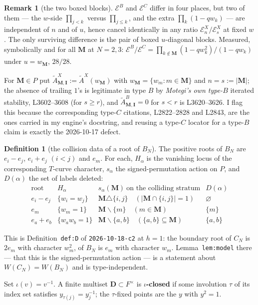 \documentclass[11pt]{article}
\theoremstyle{definition}
\newtheorem{defn}[thm]{Definition}
\newtheorem{rem}[thm]{Remark}
\newcommand{\At}{\widetilde{A}}
\newcommand{\bM}{\mathbf{M}}
\newcommand{\bI}{\mathbf{I}}
\newcommand{\bD}{\mathbf{D}}
\newcommand{\sm}{\smallsetminus}
\newcommand{\EB}{\mathcal{E}^{B}}
\newcommand{\EC}{\mathcal{E}^{C}}
\newcommand{\EX}{\mathcal{E}^{X}}
\begin{document}
\begin{rem}[the two boxed blocks]
\label{rem:boxed}
$\EB$ and $\EC$ differ in four places, but two of them --- the $w$-side
$\prod_{j<k}$ versus $\prod_{j\le k}$, and the extra $\prod_k(1-qw_k)$ --- are
independent of $n$ and of $u$, hence cancel identically in any ratio
$\EX_{n}/\EX_{s}$ at fixed $w$.  The only surviving difference is the pair of
boxed $u$-diagonal blocks.  Measured, symbolically and for all $\bM$ at
$N=2,3$: $\EB/\EC=\prod_{k\notin\bM}(1-qw_k^{2})/(1-qw_k)$ under
$u=w_{\bM}$, $28/28$.
\end{rem}

For $\bM\in P$ put $\At^{X}_{\bM,\bI}:=\At^{X}(w_{\bM})$ with
$w_{\bM}=\{w_m:m\in\bM\}$ and $n=s:=|\bM|$; the absence of trailing $1$'s is
legitimate in type $B$ by \emph{Motegi's own type-$B$} iterated stability,
L3602--3608 (for $s\ge r$), and $\At^{B}_{\bM,\bI}=0$ for $s<r$ is L3620--3626.
I flag this because the corresponding type-$C$ citations, L2822--2828 and L2843,
are the ones carried in my engine's docstring, and reusing a type-$C$ locator
for a type-$B$ claim is exactly the 2026-10-17 defect.

\begin{defn}[the collision data of a root of $B_N$]\label{def:D}
The positive roots of $B_N$ are $e_i-e_j$, $e_i+e_j$ $(i<j)$ and $e_m$.  For
each, $H_\alpha$ is the vanishing locus of the corresponding $T$-curve
character, $s_\alpha$ the signed-permutation action on $P$, and $D(\alpha)$ the
set of labels deleted:
\[
\begin{array}{llll}
\text{root} & H_\alpha & s_\alpha(\bM)\ \text{on the colliding stratum} & D(\alpha)\\\hline
e_i-e_j & \{w_i=w_j\} & \bM\triangle\{i,j\}\quad(|\bM\cap\{i,j\}|=1) & \varnothing\\
e_m  & \{w_m=1\}&\bM\sm\{m\}\quad(m\in\bM) & \{m\}\\
e_a+e_b & \{w_aw_b=1\}&\bM\sm\{a,b\}\quad(\{a,b\}\subseteq\bM) & \{a,b\}
\end{array}
\]
\end{defn}

\noindent
This is Definition~\texttt{def:D} of \texttt{2026-10-18-c2} at $h=1$: the
boundary root of $C_N$ is $2e_m$ with character $w_m^{2}$, of $B_N$ is $e_m$ with
character $w_m$.  Lemma~\texttt{lem:model} there --- that this is the
signed-permutation action --- is a statement about $W(C_N)=W(B_N)$ and is
type-independent.

Set $\iota(v)=v^{-1}$.  A finite multiset $\bD\subset F^{\times}$ is
\textbf{$\iota$-closed} if some involution $\tau$ of its index set satisfies
$y_{\tau(j)}=y_j^{-1}$; the $\tau$-fixed points are the $y$ with $y^{2}=1$.
\end{document}
